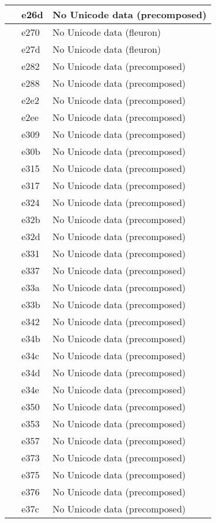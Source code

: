 \documentclass[12pt,letterpaper,openany]{book}
\begin{document}
\begin{center}
\begin{supertabular}{|m{0.25in}|m{0.5in}|m{4in}|}
 & e26d & No Unicode data (precomposed)\\\hline
 & e270 & No Unicode data (fleuron)\\\hline
 & e27d & No Unicode data (fleuron)\\\hline
 & e282 & No Unicode data (precomposed)\\\hline
 & e288 & No Unicode data (precomposed)\\\hline
 & e2e2 & No Unicode data (precomposed)\\\hline
 & e2ee & No Unicode data (precomposed)\\\hline
 & e309 & No Unicode data (precomposed)\\\hline
 & e30b & No Unicode data (precomposed)\\\hline
 & e315 & No Unicode data (precomposed)\\\hline
 & e317 & No Unicode data (precomposed)\\\hline
 & e324 & No Unicode data (precomposed)\\\hline
 & e32b & No Unicode data (precomposed)\\\hline
 & e32d & No Unicode data (precomposed)\\\hline
 & e331 & No Unicode data (precomposed)\\\hline
 & e337 & No Unicode data (precomposed)\\\hline
 & e33a & No Unicode data (precomposed)\\\hline
 & e33b & No Unicode data (precomposed)\\\hline
 & e342 & No Unicode data (precomposed)\\\hline
 & e34b & No Unicode data (precomposed)\\\hline
 & e34c & No Unicode data (precomposed)\\\hline
 & e34d & No Unicode data (precomposed)\\\hline
 & e34e & No Unicode data (precomposed)\\\hline
 & e350 & No Unicode data (precomposed)\\\hline
 & e353 & No Unicode data (precomposed)\\\hline
 & e357 & No Unicode data (precomposed)\\\hline
 & e373 & No Unicode data (precomposed)\\\hline
 & e375 & No Unicode data (precomposed)\\\hline
 & e376 & No Unicode data (precomposed)\\\hline
 & e37c & No Unicode data (precomposed)\\\hline

\end{supertabular}
\end{center}
\end{document}
